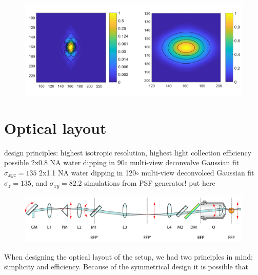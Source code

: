 \begin{figure}
    \centering
    \includegraphics[width=1\textwidth]{psfs/SPIMx120.pdf}
    \label{fig:psf-spimx120}
\end{figure}
    


\section{Optical layout}
design principles:
highest isotropic resolution, highest light collection efficiency possible
2x0.8 NA water dipping in 90$\circ$ multi-view deconvolve Gaussian fit $\sigma_{xyz}=135$
2x1.1 NA water dipping in 120$\circ$ multi-view deconvolced Gaussian fit $\sigma_z = 135$, and $\sigma_{xy} = 82.2$
simulations from PSF generator! put here

\begin{figure}[bth]
    \centering
    \includegraphics[page=1,width=1\textwidth]{schematicsLinear}
    \label{fig:schematicsLinear}
\end{figure}

When designing the optical layout of the setup, we had two principles in mind: simplicity and efficiency. Because of the symmetrical design it is possible that


